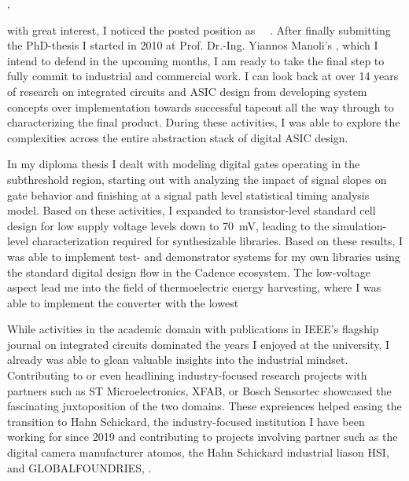 



\recipient{\firma{}}{\adresse{}}
\opening{\anrede{},}
\date{\today}


\makelettertitle
\justifying


with great interest, I noticed the posted position as \stelleText~\firmaText~. After finally submitting the PhD-thesis I started in 2010 at Prof. Dr.-Ing. Yiannos Manoli's \chair, which I intend to defend in the upcoming months, I am ready to take the final step to fully commit to industrial and commercial work. I can look back at over 14 years of research on integrated circuits and ASIC design from developing system concepts over implementation towards successful tapeout all the way through to characterizing the final product. During these activities, I was able to explore the complexities across the entire abstraction stack of digital ASIC design.\par

In my diploma thesis I dealt with modeling digital gates operating in the subthreshold region, starting out with analyzing the impact of signal slopes on gate behavior and finishing at a signal path level statistical timing analysis model. Based on these activities, I expanded to transistor-level standard cell design for low supply voltage levels down to \SI{70}{\milli\volt}, leading to the simulation-level characterization required for synthesizable libraries. Based on these results, I was able to implement test- and demonstrator systems for my own libraries using the standard digital design flow in the Cadence ecosystem. The low-voltage aspect lead me into the field of thermoelectric energy harvesting, where I was able to implement the converter with the lowest \par

While activities in the academic domain with publications in IEEE's flagship journal on integrated circuits dominated the years I enjoyed at the university, I already was able to glean valuable insights into the industrial mindset. Contributing to or even headlining industry-focused research projects with partners such as ST Microelectronics, XFAB, or Bosch Sensortec showcased the fascinating juxtoposition of the two domains. These expreiences helped easing the transition to Hahn Schickard, the industry-focused institution I have been working for since 2019 and contributing to projects involving partner such as the digital camera manufacturer atomos, the Hahn Schickard industrial liason HSI, and GLOBALFOUNDRIES, .\par




